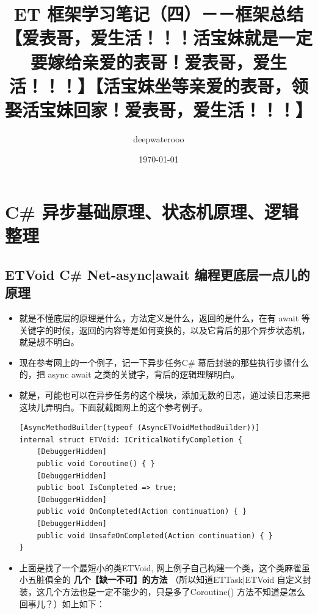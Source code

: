 \documentclass[9pt, b5paper]{article}
\author{deepwaterooo}
\date{\today}
\title{ET 框架学习笔记（四）－－框架总结【爱表哥，爱生活！！！活宝妹就是一定要嫁给亲爱的表哥！爱表哥，爱生活！！！】【活宝妹坐等亲爱的表哥，领娶活宝妹回家！爱表哥，爱生活！！！】}
\begin{document}
\maketitle
\tableofcontents


\section{C\# 异步基础原理、状态机原理、逻辑整理}
\label{sec-1}
\subsection{ETVoid C\# Net-async|await 编程更底层一点儿的原理}
\label{sec-1-1}
\begin{itemize}
\item 就是不懂底层的原理是什么，方法定义是什么，返回的是什么，在有 await 等关键字的时候，返回的内容等是如何变换的，以及它背后的那个异步状态机，就是想不明白。
\item 现在参考网上的一个例子，记一下异步任务C\# 幕后封装的那些执行步骤什么的，把 async await 之类的关键字，背后的逻辑理解明白。
\item 就是，可能也可以在异步任务的这个模块，添加无数的日志，通过读日志来把这块儿弄明白。下面就截图网上的这个参考例子。
\begin{verbatim}
[AsyncMethodBuilder(typeof (AsyncETVoidMethodBuilder))]
internal struct ETVoid: ICriticalNotifyCompletion {
    [DebuggerHidden]
    public void Coroutine() { }
    [DebuggerHidden]
    public bool IsCompleted => true;
    [DebuggerHidden]
    public void OnCompleted(Action continuation) { }
    [DebuggerHidden]
    public void UnsafeOnCompleted(Action continuation) { }
}
\end{verbatim}
\item 上面是找了一个最短小的类ETVoid, 网上例子自己构建一个类，这个类麻雀虽小五脏俱全的 \textbf{几个【缺一不可】的方法} （所以知道ETTask|ETVoid 自定义封装，这几个方法也是一定不能少的，只是多了Coroutine() 方法不知道是怎么回事儿？）如上如下：
\end{itemize}
\end{document}
